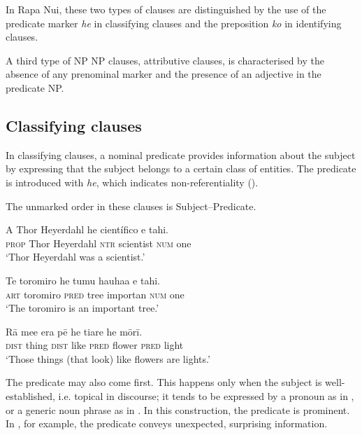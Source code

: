 In Rapa Nui, these two types of clauses are distinguished by the use of the predicate marker \textit{he} in classifying clauses and the preposition \textit{ko} in identifying clauses.

A third type of NP NP clauses, attributive clauses, is characterised by the absence of any prenominal marker and the presence of an adjective in the predicate NP.

\subsection{Classifying clauses}\label{sec:9.2.1}
In classifying clauses, a nominal predicate provides information about the subject by expressing that the subject belongs to a certain class of entities. The predicate is introduced with \textit{he}, which indicates non-referentiality ().

The unmarked order in these clauses is Subject–Predicate.

\ea\label{ex:9.1}
\gll A Thor Heyerdahl he científico e tahi.\\
\textsc{prop} Thor Heyerdahl \textsc{ntr} scientist \textsc{num} one\\

\glt 
‘Thor Heyerdahl was a scientist.’ \textstyleExampleref{[R376.007]} 
\z

\ea\label{ex:9.2}
\gll Te toromiro he tumu hauha{\ꞌ}a e tahi. \\
\textsc{art} toromiro \textsc{pred} tree importan \textsc{num} one \\

\glt 
‘The toromiro is an important tree.’ \textstyleExampleref{[R478.053]} 
\z

\ea\label{ex:9.3}
\gll Rā me{\ꞌ}e era pē he tiare he mōrī. \\
\textsc{dist} thing \textsc{dist} like \textsc{pred} flower \textsc{pred} light \\

\glt
‘Those things (that look) like flowers are lights.’ \textstyleExampleref{[R210.199]} 
\z

The predicate may also come first. This happens only when the subject is well-es\-tab\-lished, i.e. topical in discourse; it tends to be expressed by a pronoun as in , or a generic noun phrase as in . In this construction, the predicate is prominent. In , for example, the predicate conveys unexpected, surprising information.

